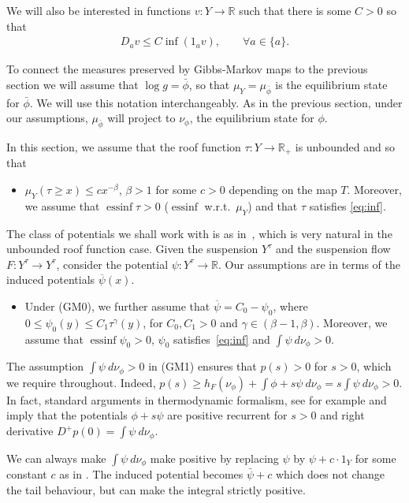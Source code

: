 \documentclass[12pt]{article}
\numberwithin{equation}{section}
\newcommand{\essinf}{\operatorname{essinf}}
\newcommand{\R}{\mathbb{R}}
\newcommand{\F}{F}
\begin{document}
We will also be interested in functions $v:Y\to \R$ such that there is some $C>0$ so that
 \begin{align}\label{eq:inf}
 D_av\le C\inf(1_av), \qquad \forall a\in\{a\}.
 \end{align}

To connect the measures preserved by Gibbs-Markov maps to the previous section we will assume that $\log g = \bar\phi$, so that $\mu_Y=\mu_{\bar\phi}$ is the equilibrium state for $\bar\phi$.  We will use this notation interchangeably.  As in the previous section, under our assumptions, $\mu_{\bar\phi}$ will project to $\nu_\phi$, the equilibrium state for $\phi$.

In this section, we assume that the roof function $\tau:Y\to\R_{+}$
is unbounded and so that
\begin{itemize}
 \item[(GM0)] $\mu_Y(\tau\ge x)\le c x^{-\beta}$, $\beta>1$ for some $c>0$ depending on the map $T$.
 Moreover, we assume that
  $\essinf\tau>0$ ($\essinf$ w.r.t.\ $\mu_Y$)
 and that $\tau$ satisfies \eqref{eq:inf}.
\end{itemize}




The class of potentials we shall work with is as in~\cite{BruTerTod19, BruTerTod21}, which is very natural in the unbounded roof function case.  
Given the suspension $Y^\tau$ and the suspension flow $\F:Y^\tau\to Y^\tau$, consider the potential $\psi: Y^\tau\to \R$.
Our assumptions are in terms of the induced potentials $\overline\psi(x)$.


\begin{itemize}
 \item[(GM1)] Under (GM0), we further assume that $\overline\psi=C_0-\psi_0$, where $0\le\psi_0 (y)
 \le C_1\tau^\gamma (y)$, for $C_0, C_1 > 0$ and
$\gamma\in(\beta-1, \beta)$. Moreover, we assume that
$\essinf\psi_0>0$, $\psi_0$ satisfies~\eqref{eq:inf} and $\int\psi~d\nu_\phi>0$.
\end{itemize}

\begin{rmk}\label{rmk:p>0}
The assumption $\int\psi~d\nu_\phi>0$ in (GM1) ensures that  $p(s)>0$ for $s>0$, which we require throughout. Indeed, $p(s) \ge h_F(\nu_\phi)+\int\phi+s\psi~d\nu_\phi=s \int\psi~d\nu_\phi>0$.  In fact, standard arguments in thermodynamic formalism, see for example \cite[Theorem 4.6.5]{PrzUrb10} and \cite{Sar06} imply that the potentials $\phi+s\psi$ are positive recurrent for $s>0$ and right derivative $D^+p(0)=  \int\psi~d\nu_\phi$.

We can always make $\int\psi~d\nu_\phi$ make positive by replacing $\psi$ by $\psi+c\cdot 1_Y$ for some constant $c$ as in \cite[Remark 8.4]{BruTerTod19}.
The induced potential becomes $\bar\psi+c$ which does not change the tail behaviour, but can make the integral strictly positive.
\end{rmk}
\end{document}
